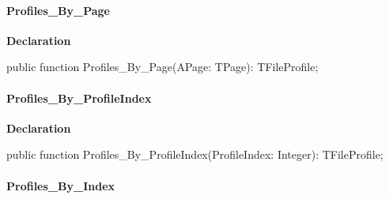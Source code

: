 \documentclass{report}
\newif\ifpdf
\begin{document}
\paragraph*{Profiles{\_}By{\_}Page}\hspace*{\fill}

\label{editor.TFileProfiles-Profiles_By_Page}
\begin{list}{}{
\setlength{\itemindent}{0cm}
\setlength{\listparindent}{0cm}
\setlength{\leftmargin}{\evensidemargin}
\addtolength{\leftmargin}{\tmplength}
\settowidth{\labelsep}{X}
\addtolength{\leftmargin}{\labelsep}
\setlength{\labelwidth}{\tmplength}
}
\item[\textbf{Declaration}\hfill]
\ifpdf
\begin{flushleft}
\fi
\begin{ttfamily}
public function Profiles{\_}By{\_}Page(APage: TPage): TFileProfile;\end{ttfamily}

\ifpdf
\end{flushleft}
\fi

\end{list}
\paragraph*{Profiles{\_}By{\_}ProfileIndex}\hspace*{\fill}

\label{editor.TFileProfiles-Profiles_By_ProfileIndex}
\begin{list}{}{
\setlength{\itemindent}{0cm}
\setlength{\listparindent}{0cm}
\setlength{\leftmargin}{\evensidemargin}
\addtolength{\leftmargin}{\tmplength}
\settowidth{\labelsep}{X}
\addtolength{\leftmargin}{\labelsep}
\setlength{\labelwidth}{\tmplength}
}
\item[\textbf{Declaration}\hfill]
\ifpdf
\begin{flushleft}
\fi
\begin{ttfamily}
public function Profiles{\_}By{\_}ProfileIndex(ProfileIndex: Integer): TFileProfile;\end{ttfamily}

\ifpdf
\end{flushleft}
\fi

\end{list}
\paragraph*{Profiles{\_}By{\_}Index}\hspace*{\fill}
\end{document}
